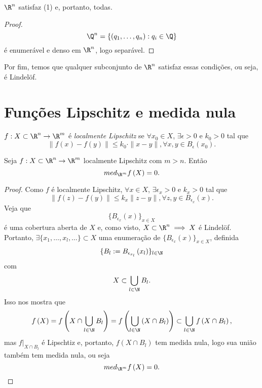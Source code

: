 \begin{corollary}
    $\R^{n}$ satisfaz (1) e, portanto, todas.
\end{corollary}

\begin{proof}
    \[
    \Q^{n} = \{\left( q_1,\ldots,q_n \right) : q_i \in \Q\} 
    \] é enumerável e denso em $\R^{n}$, logo separável.
\end{proof}

Por fim, temos que qualquer subconjunto de $\R^{n}$ satisfaz essas condições, ou seja, é Lindelöf.

\section*{Funções Lipschitz e medida nula}

\begin{definition}
    $f: X\subset \R^{n} \to \R^{m}$ é \emph{localmente Lipschitz} se $\forall x_0\in X$, $\exists \epsilon>0$ e $k_0>0$ tal que \[
    \|f\left( x \right) -f\left( y \right) \|\le k_0\cdot \|x-y\|, \forall x,y\in B_{\epsilon}\left( x_0 \right) 
    .\] 
\end{definition}

\begin{prop}
    Seja $f: X\subset \R^{n} \to  \R^{m}$ localmente Lipschitz com $m>n$. Então \[
    med_{\R^{m}}f\left( X \right) =0
    .\] 
\end{prop}

\begin{proof}
    Como $f$ é localmente Lipschitz, $\forall x\in X$, $\exists \epsilon_x > 0$ e $k_x > 0$ tal que \[
    \|f\left( z \right) -f\left( y \right) \|\le k_x \|z-y\|, \forall z,y \in B_{\epsilon_x}\left( x \right) 
    .\] Veja que \[
    \{B_{\epsilon_x}\left( x \right) \} _{x\in X}
    \] é uma cobertura aberta de $X$ e, como visto, $X\subset \R^{n} \implies X$ é Lindelöf. Portanto, $\exists \{x_1,\ldots,x_l,\ldots\} \subset X$ uma enumeração de $\{B_{\epsilon_x}\left( x \right) \} _{x\in X}$, definida \[
    \{B_l := B_{\epsilon_{x_l}}\left( x_l \right)\} _{l\in \N}
    \]  com \[
    X \subset \bigcup_{l\in \N} B_l
    .\] Isso nos mostra que \[
    f\left( X \right) = f\left( X\cap \bigcup_{l\in \N} B_l \right) = f\left( \bigcup_{l\in \N} \left( X\cap B_l \right)  \right) \subset \bigcup_{l\in \N} f\left( X\cap B_l \right) 
    ,\] mas $f|_{X\cap B_l}$ é Lipschtiz e, portanto, $f\left( X\cap B_l \right) $ tem medida nula, logo sua união também tem medida nula, ou seja \[
    med_{\R^{m}}f\left( X \right) = 0
    .\] 
\end{proof}

